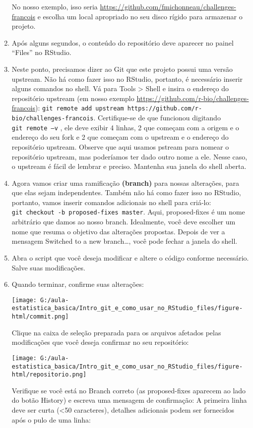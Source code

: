 \documentclass[]{book}
\begin{document}
\begin{enumerate}
  No nosso exemplo, isso seria \url{https://github.com/fmichonneau/challenges-francois} e escolha um local apropriado no seu disco rígido para armazenar o projeto.
\item
  Após alguns segundos, o conteúdo do repositório deve aparecer no painel ``Files'' no RStudio.
\item
  Neste ponto, precisamos dizer ao Git que este projeto possui uma versão upstream. Não há como fazer isso no RStudio, portanto, é necessário inserir alguns comandos no shell. Vá para Tools \textgreater{} Shell e insira o endereço do repositório upstream (em nosso exemplo \url{https://github.com/r-bio/challenges-francois}):
  \texttt{git\ remote\ add\ upstream\ https://github.com/r-bio/challenges-francois}.
  Certifique-se de que funcionou digitando \texttt{git\ remote\ –v} , ele deve exibir 4 linhas, 2 que começam com a origem e o endereço do seu fork e 2 que começam com o upstream e o endereço do repositório upstream. Observe que aqui usamos pstream para nomear o repositório upstream, mas poderíamos ter dado outro nome a ele. Nesse caso, o upstream é fácil de lembrar e preciso. Mantenha sua janela do shell aberta.
\item
  Agora vamos criar uma ramificação \textbf{(branch)} para nossas alterações, para que elas sejam independentes. Também não há como fazer isso no RStudio, portanto, vamos inserir comandos adicionais no shell para criá-lo:
  \texttt{git\ checkout\ -b\ proposed-fixes\ master}.
  Aqui, proposed-fixes é um nome arbitrário que damos ao nosso branch. Idealmente, você deve escolher um nome que resuma o objetivo das alterações propostas. Depois de ver a mensagem Switched to a new branch\ldots{}, você pode fechar a janela do shell.
\item
  Abra o script que você deseja modificar e altere o código conforme necessário. Salve suas modificações.
\item
  Quando terminar, confirme suas alterações:

  \texttt{[image: G:/aula-estatistica\_basica/Intro\_git\_e\_como\_usar\_no\_RStudio\_files/figure-html/commit.png]}

  Clique na caixa de seleção preparada para os arquivos afetados pelas modificações que você deseja confirmar no seu repositório:

  \texttt{[image: G:/aula-estatistica\_basica/Intro\_git\_e\_como\_usar\_no\_RStudio\_files/figure-html/repositorio.png]}

  Verifique se você está no Branch correto (as proposed-fixes aparecem ao lado do botão History) e escreva uma mensagem de confirmação: A primeira linha deve ser curta (\textless{}50 caracteres), detalhes adicionais podem ser fornecidos após o pulo de uma linha:


\end{enumerate}
\end{document}
